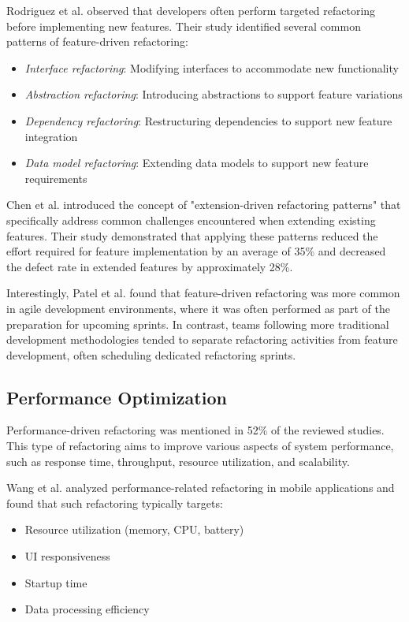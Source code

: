 \documentclass[journal,onecolumn]{IEEEtran}
\begin{document}
Rodriguez et al. \cite{rodriguez2022} observed that developers often perform targeted refactoring before implementing new features. Their study identified several common patterns of feature-driven refactoring:
\begin{itemize}
    \item \textit{Interface refactoring}: Modifying interfaces to accommodate new functionality
    \item \textit{Abstraction refactoring}: Introducing abstractions to support feature variations
    \item \textit{Dependency refactoring}: Restructuring dependencies to support new feature integration
    \item \textit{Data model refactoring}: Extending data models to support new feature requirements
\end{itemize}

Chen et al. \cite{chen2023} introduced the concept of "extension-driven refactoring patterns" that specifically address common challenges encountered when extending existing features. Their study demonstrated that applying these patterns reduced the effort required for feature implementation by an average of 35\% and decreased the defect rate in extended features by approximately 28\%.

Interestingly, Patel et al. \cite{patel2023} found that feature-driven refactoring was more common in agile development environments, where it was often performed as part of the preparation for upcoming sprints. In contrast, teams following more traditional development methodologies tended to separate refactoring activities from feature development, often scheduling dedicated refactoring sprints.

\subsection{Performance Optimization}
Performance-driven refactoring was mentioned in 52\% of the reviewed studies. This type of refactoring aims to improve various aspects of system performance, such as response time, throughput, resource utilization, and scalability.

Wang et al. \cite{wang2022} analyzed performance-related refactoring in mobile applications and found that such refactoring typically targets:
\begin{itemize}
    \item Resource utilization (memory, CPU, battery)
    \item UI responsiveness
    \item Startup time
    \item Data processing efficiency
\end{itemize}
\end{document}
